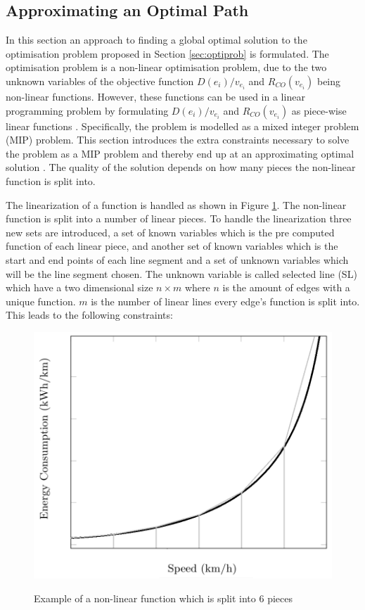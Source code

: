 
\subsection{Approximating an Optimal Path}\label{sec:LP}
In this section an approach to finding a global optimal solution to the optimisation problem proposed in Section \ref{sec:optiprob} is formulated. The optimisation problem is a non-linear optimisation problem, due to the two unknown variables of the objective function \( D(e_i)/v_{e_i} \) and $R_{CO}(v_{e_i})$ being non-linear functions. However, these functions can be used in a linear programming problem by formulating \( D(e_i)/v_{e_i} \) and $R_{CO}(v_{e_i})$ as piece-wise linear functions \cite{ahuja1995capacity}. Specifically, the problem is modelled as a mixed integer problem (MIP) problem. This section introduces the extra constraints necessary to solve the problem as a MIP problem and thereby end up at an approximating optimal solution \cite{piecewiseglpk}. The quality of the solution depends on how many pieces the non-linear function is split into. 

The linearization of a function is handled as shown in Figure \ref{fig:linearization_example}. The non-linear function is split into a number of linear pieces. To handle the linearization three new sets are introduced, a set of known variables which is the pre computed function of each linear piece, and another set of known variables which is the start and end points of each line segment and a set of unknown variables which will be the line segment chosen. The unknown variable is called selected line (SL) which have a two dimensional size $n \times m$ where $n$ is the amount of edges with a unique function. $m$ is the number of linear lines every edge's function is split into. This leads to the following constraints:  

\begin{figure}[h!]
\centering
\includegraphics[scale=0.33]{images/linearization_example}
\label{fig:linearization_example}
\caption{Example of a non-linear function which is split into 6 pieces}
\end{figure}

